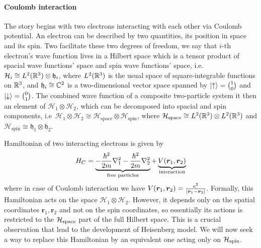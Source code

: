 \paragraph{Coulomb interaction}The story begins with two electrons interacting with each other via Coulomb potential.
An electron can be described by two quantities, its position in space and its spin.
Two facilitate these two degrees of freedom, we say that \(i\)-th electron's wave function
lives in a Hilbert space which is a tensor product of spacial 
wave functions' space and spin wave functions' space, i.e.\ \(\mathcal{H}_i \cong L^2(\mathbb{R}^3)
\otimes \mathfrak{h}_i \), where \(L^2(\mathbb{R}^3)\) is the usual space of square-integrable functions on
\(\mathbb{R}^3\), and \(\mathfrak{h}_i \cong \mathbb{C}^2\) is a two-dimensional vector space spanned by
\(\ket{\uparrow} = \binom{1}{0} \) and \(\ket{\downarrow} = \binom{0}{1}\).
The combined wave function of a composite two-particle system it then an element of
\(\mathcal{H}_1 \otimes \mathcal{H}_2\), which can be decomposed into spacial and spin
components, i.e\ \(\mathcal{H}_1 \otimes \mathcal{H}_2 \cong\mathcal{H}_{\mathrm{space}} 
\otimes \mathcal{H}_{\mathrm{spin}}\), where \(\mathcal{H}_{\mathrm{space}} 
\cong L^2(\mathbb{R}^3) \otimes L^2(\mathbb{R}^3)\) and \(\mathcal{H}_{\mathrm{spin}} \cong
\mathfrak{h}_1 \otimes \mathfrak{h}_2\). 

Hamiltonian of two interacting electrons is given by
\begin{equation}
    H_C = \underbrace{-\frac{\hbar^2}{2m} \laplacian_1  
    -\frac{\hbar^2}{2m} \laplacian_2 }_{\textrm{free particles}}
     + \underbrace{V(\bm{r}_1,\bm{r}_2)}_{\textrm{interaction}}
     \label{eq:Coulomb Hamiltonian}
\end{equation}
where in case of Coulomb interaction we have \(V(\bm{r}_1,\bm{r}_2)=\frac{\mathrm{e}^2}
{\abs{\bm{r}_1-\bm{r}_2}}\).
Formally, this Hamiltonian acts on the space \(\mathcal{H}_1 \otimes \mathcal{H}_2\).
However, it depends only on the spatial coordinates \(\bm{r}_1,\bm{r}_2\) and not on
the spin coordinates, so essentially
its actions is restricted to the \(\mathcal{H}_{\textrm{space}}\) part of the full Hilbert space.
This is a crucial observation that lead to the development of Heisenberg model. We will now
seek a way to replace this Hamiltonian by an equivalent one acting only on 
\(\mathcal{H}_{\textrm{spin}}\).

